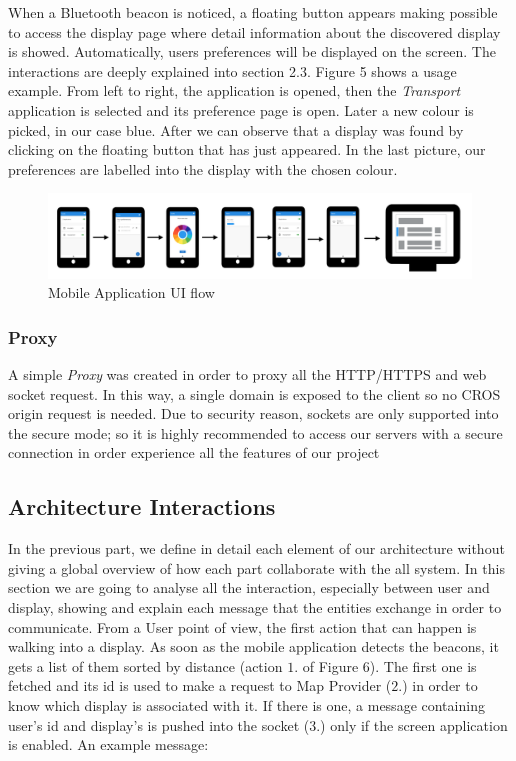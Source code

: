 \documentclass[]{usiinfbachelorproject}
\begin{document}
When a Bluetooth beacon is noticed, a floating button appears making possible to access the display page where detail information about the discovered display is showed. Automatically, users preferences will be displayed on the screen. The interactions are deeply explained into section 2.3. Figure 5 shows a usage example. From left to right, the application is opened, then the \emph{Transport} application is selected and its preference page is open. Later a new colour is picked, in our case blue. After we can observe that a display was found by clicking on the floating button that has just appeared. In the last picture, our preferences are labelled into the display with the chosen colour.
\begin{figure}[H]
  \centering
  \includegraphics[width=1\textwidth]{./images/UI_flow.png}
   \caption{Mobile Application UI flow}

\end{figure}

\subsubsection{Proxy}
A simple \emph{Proxy} was created in order to proxy all the HTTP/HTTPS and web socket request. In this way, a single domain is exposed to the client so no CROS origin request is needed. Due to security reason, sockets are only supported into the secure mode; so it is highly recommended to access our servers with a secure connection in order experience all the features of our project
 
\subsection{Architecture Interactions}

In the previous part, we define in detail each element of our architecture without giving a global overview of how each part collaborate with the all system. In this section we are going to analyse all the interaction, especially between user and display, showing and explain each message that the entities exchange in order to communicate. From a User point of view, the first action that can happen is walking into a display. As soon as the mobile application detects the beacons, it gets a list of them sorted by distance (action $1.$ of Figure 6). The first one is fetched and its id is used to make a request to Map Provider ($2.$) in order to know which display is associated with it. If there is one, a message containing user's id and display's is pushed into the socket ($3.$) only if the screen application is enabled. An example message:
 
\end{document}
